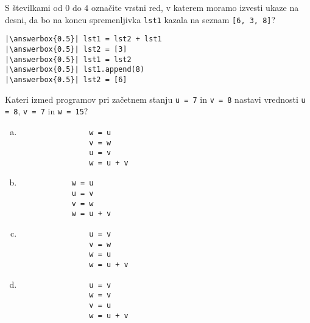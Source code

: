 \documentclass[arhiv, 10pt]{../izpit}
\newcommand{\inlinepy}[1]{\texttt{#1}}
\newcommand{\answerbox}[1]{\framebox{\vphantom{\large M}\hspace{#1cm}}}
\begin{document}
        \naloga*
        \begin{multicols}{2}
        \noindent 
        S številkami od $0$ do $4$ označite vrstni red, v katerem moramo izvesti ukaze na desni, da bo na koncu spremenljivka \inlinepy{lst1} kazala na seznam \inlinepy{[6, 3, 8]}?
    
        \columnbreak
        \noindent
        \begin{verbatim}
|\answerbox{0.5}| lst1 = lst2 + lst1
|\answerbox{0.5}| lst2 = [3]
|\answerbox{0.5}| lst1 = lst2
|\answerbox{0.5}| lst1.append(8)
|\answerbox{0.5}| lst2 = [6]

        \end{verbatim}
        \end{multicols}
    
            
        \naloga*
        
        Kateri izmed programov pri začetnem stanju
            \inlinepy{u = 7} in
            \inlinepy{v = 8}
        nastavi vrednosti
            \inlinepy{u = 8},
            \inlinepy{v = 7} in
            \inlinepy{w = 15}?
    
        \begin{multicols}{4}
        \begin{enumerate}[(a)]
\item 
                \begin{verbatim}
                w = u
                v = w
                u = v
                w = u + v
                \end{verbatim}
            
\item 
            \begin{verbatim}
            w = u
            u = v
            v = w
            w = u + v
            \end{verbatim}
        
\item 
                \begin{verbatim}
                u = v
                v = w
                w = u
                w = u + v
                \end{verbatim}
            
\item 
                \begin{verbatim}
                u = v
                w = v
                v = u
                w = u + v
                \end{verbatim}
            
\end{enumerate}

        \end{multicols}
    
\end{document}
